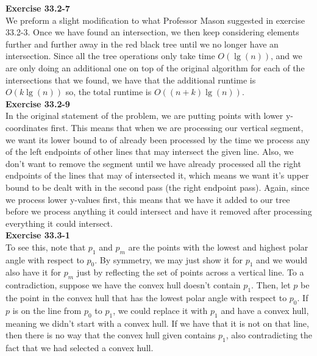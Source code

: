 \documentclass{article}
\begin{document}
\noindent\textbf{Exercise 33.2-7}\\

We preform a slight modification to what Professor Mason suggested in exercise 33.2-3. Once we have found an intersection, we then keep considering elements further and further away in the red black tree until we no longer have an intersection. Since all the tree operations only take time $O(\lg(n))$, and we are only doing an additional one on top of the original algorithm for each of the intersections that we found, we have that the additional runtime is $O(k\lg(n))$ so, the total runtime is $O((n+k)\lg(n))$.\\



\noindent\textbf{Exercise 33.2-9}\\

In the original statement of the problem, we are putting points with lower y-coordinates first. This means that when we are processing our vertical segment, we want its  lower bound to of already been processed by the time we process any of the left endpoints of other lines that may intersect the given line.  Also, we don't want to remove the segment until we have already processed all the right endpoints of the lines that may of intersected it, which means we want it's upper bound to be dealt with in the second pass (the right endpoint pass). Again, since we process lower y-values first, this means that we have it added to our tree before we process anything it could intersect and have it removed after processing everything it could intersect.\\



\noindent\textbf{Exercise 33.3-1}\\

To see this, note that $p_1$ and $p_m$ are the points with the lowest and highest polar angle with respect to $p_0$. By symmetry, we may just show it for $p_1$ and we would also have it for $p_m$ just by reflecting the set of points across a vertical line. To a contradiction, suppose we have the convex hull doesn't contain $p_1$. Then, let $p$ be the point in the convex hull that has the lowest polar angle with respect to $p_0$. If $p$ is on the line from $p_0$ to $p_1$, we could replace it with $p_1$ and have a convex hull, meaning we didn't start with a convex hull. If we have that it is not on that line, then there is no way that the convex hull given contains $p_1$, also contradicting the fact that we had selected a convex hull.\\
\end{document}
